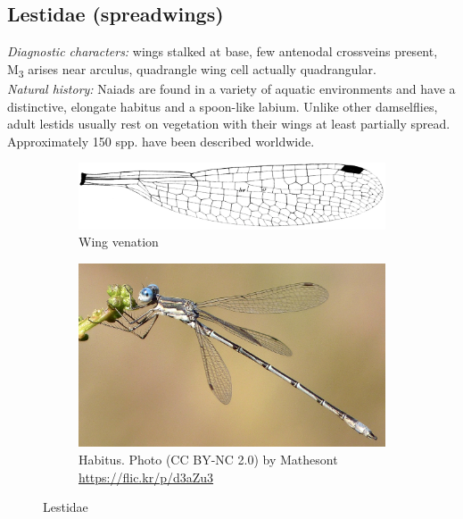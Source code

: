 \documentclass[letterpaper, 11pt]{article}
\begin{document}
\subsection{Lestidae (spreadwings)}
\noindent{}\textit{Diagnostic characters:} wings stalked at base, few antenodal crossveins present, \texorpdfstring{M\textsubscript{3}}{ }{ } arises near arculus, quadrangle wing cell actually quadrangular. \\

\noindent{}\textit{Natural history:} Naiads are found in a variety of aquatic environments and have a distinctive, elongate habitus and a spoon-like labium. Unlike other damselflies, adult lestids usually rest on vegetation with their wings at least partially spread. Approximately 150 spp. have been described worldwide.\\ 

\begin{figure}[ht!]
    \centering
    \begin{subfigure}[ht!]{0.45\textwidth}
        \includegraphics[width=\textwidth]{LestidWing}
        \caption{Wing venation \citep[][Fig. 232]{comstock1918wings}}
        \label{fig:lestwing}
    \end{subfigure}
    \hfill
    \begin{subfigure}[ht!]{0.45\textwidth}
        \includegraphics[width=\textwidth]{LestidHabitus}
        \caption{Habitus. Photo (CC BY-NC 2.0) by Mathesont \url{https://flic.kr/p/d3aZu3}}
        \label{fig:lestbody}
    \end{subfigure}
    \caption{Lestidae}\label{fig:lestid}
\end{figure}%
\end{document}

